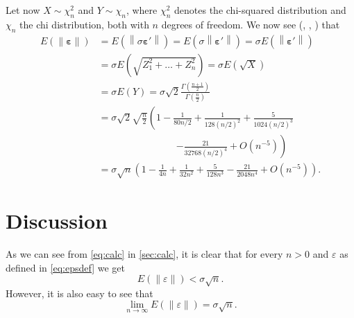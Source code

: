 \documentclass[12pt,a4]{article}
\newcommand{\lnorm}{\left\|}
\newcommand{\rnorm}{\right\|}
\newcommand{\eps}{\ensuremath{\varepsilon}}
\newcommand{\vc}[1]{\ensuremath{\bm{#1}}}
\begin{document}
Let now $X \sim \chi_n^2$ and $Y \sim \chi_n$, where $\chi_n^2$ denotes the chi-squared distribution and $\chi_n$ the chi distribution, both with $n$ degrees of freedom. We now see (\cite{handbook}, \cite{chi}, \cite{mathworld}) that
\begin{equation}
\label{eq:calc}
\begin{alignedat}{1}
E\left(\lnorm \vc{\eps} \rnorm \right)   &= E\left(\lnorm \sigma \vc{\eps'} \rnorm \right)   =
E\left(\sigma \lnorm \vc{\eps'} \rnorm \right) = \sigma E\left(\lnorm \vc{\eps'} \rnorm \right) \\
&= \sigma E\left(\sqrt{Z_1^2 + \ldots + Z_n^2} \right) = \sigma E\left(\sqrt{X} \right) \\
&= \sigma E\left( Y \right) = 
\sigma \sqrt{2}\frac{\Gamma\left(\frac{n+1}{2}\right)}{\Gamma\left(\frac{n}{2}\right)} \\
&= \sigma \sqrt{2} \sqrt{\frac{n}{2}} \left( 1 - \frac{1}{80 n/2} + \frac{1}{128 (n/2)^2} + \frac{5}{1024 (n/2)^3} \right. \\ & \qquad \qquad \qquad \qquad \left. - \frac{21}{32768 (n/2)^4} + O\left( n^{-5} \right) \right) \\
&= \sigma \sqrt{n} \left( 1 - \frac{1}{4 n} + \frac{1}{32 n^2} + \frac{5}{128 n^3} - \frac{21}{2048 n^4} + O\left( n^{-5} \right) \right) .
\end{alignedat}
\end{equation}

\section{Discussion}

As we can see from \cref{eq:calc} in \cref{sec:calc}, it is clear that for every $n > 0$ and $\eps$ as defined in \cref{eq:epsdef} we get
\begin{equation}
E \left( \lnorm \eps \rnorm \right) < \sigma \sqrt{n} .
\end{equation}
However, it is also easy to see that 
\begin{equation}
\lim_{n \rightarrow \infty} E \left( \lnorm \eps \rnorm \right) = \sigma \sqrt{n} .
\end{equation}
\end{document}
